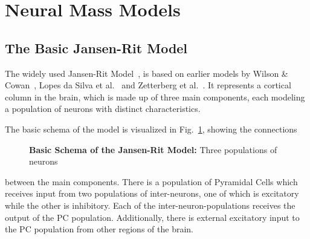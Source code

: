 \newcommand*\circled[2][black]{\tikz[baseline=(char.base)]{
    \node[scale=0.85pt,shape=circle, thin,draw=#1!60, fill=#1!5,inner sep=0.1pt] (char) {#2};}}



\section{Neural Mass Models}\label{sec:neural-mass-models}

\subsection{The Basic Jansen-Rit Model}\label{subsec:the-jansen-rit-model}

The widely used Jansen-Rit Model~\cite{jansen_neurophysiologically-based_1993, jansen_electroencephalogram_1995},
is based on earlier models by Wilson \& Cowan~\cite{wilson_excitatory_1972},
Lopes da Silva et al.~\cite{lopes_da_silva_model_1974, lopes_da_silva_models_1976} and
Zetterberg et al.~\cite{zetterberg_performance_1978}.
It represents a cortical column in the brain, which is made up of three main components,
each modeling a population of neurons with distinct characteristics.

The basic schema of the model is visualized in Fig.~\ref{fig:Jansen Rit Flowchart}, showing the connections
\begin{figure}
    
    \caption{\textbf{Basic Schema of the Jansen-Rit Model:} Three populations of neurons}
    \label{fig:Jansen Rit Flowchart}
\end{figure}
between the main components.
There is a population of Pyramidal Cells which receives input from two populations of inter-neurons,
one of which is excitatory while the other is inhibitory.
Each of the inter-neuron-populations receives the output of the PC population.
Additionally, there is external excitatory input to the PC population from other regions of the brain.

